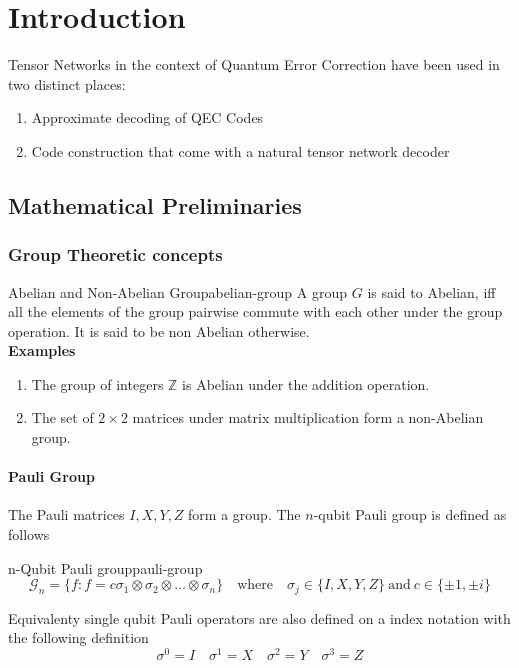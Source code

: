 \chapter{Introduction}

Tensor Networks in the context of Quantum Error Correction have been used in two distinct places:
\begin{enumerate}
    \item Approximate decoding of QEC Codes
    \item Code construction that come with a natural tensor network decoder
\end{enumerate}



\section{Mathematical Preliminaries}
\subsection{Group Theoretic concepts}
\begin{boxed-defn}{Abelian and Non-Abelian Group}{abelian-group}
A group \(G\) is said to Abelian, iff all the elements of the group pairwise commute with each other under the group operation. It is said to be non Abelian otherwise.\\
\textbf{Examples}
\begin{enumerate}
    \item The group of integers \(\mathbb{Z}\) is Abelian under the addition operation.
    \item The set of \(2 \times 2\) matrices under matrix multiplication form a non-Abelian group.
\end{enumerate}
\end{boxed-defn}

\subsubsection{Pauli Group}
The Pauli matrices \(I, X, Y,Z\) form a group. The \(n\)-qubit Pauli group is defined as follows
\begin{boxed-defn}{n-Qubit Pauli group}{pauli-group}
\begin{equation}\label{eqn: pauli-group}
    \mathcal{G}_n = \{f: f = c\sigma_1 \otimes \sigma_2 \otimes \dots \otimes \sigma_n\} \quad \text{where} \quad \sigma_j \in \{I, X, Y, Z\} \ \text{and} \ c \in \{\pm 1, \pm i\}
\end{equation}
\end{boxed-defn}
Equivalenty single qubit Pauli operators are also defined on a index notation with the following definition
\begin{equation}\label{eqn: pauli-int-map}
    \sigma^0 = I \quad \sigma^1 = X \quad \sigma^2 = Y \quad \sigma^3 = Z
\end{equation}

